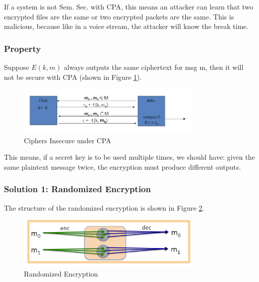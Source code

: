 If a system is not Sem. Sec. with CPA, this means an attacker can learn that two encrypted files are the same or two encrypted packets are the same. This is malicious, because like in a voice stream, the attacker will know the break time.

\subsubsection{Property}

Suppose $E(k,m)$ always outputs the same ciphertext for msg m, then it will not be secure with CPA (shown in Figure \ref{fig: 03 Ciphers Insecure under CPA}).

\begin{figure}[h]
    \centering
    \includegraphics[width=0.8\textwidth]{Stanford_Crypto_1/fig/03_block_cipher/Ciphers Insecure under CPA.png}
    \caption{Ciphers Insecure under CPA}
    \label{fig: 03 Ciphers Insecure under CPA}
\end{figure}

This means, if a secret key is to be used multiple times, we should have: given the same plaintext message twice, the encryption must produce different outputs.

\subsubsection{Solution 1: Randomized Encryption}

The structure of the randomized encryption is shown in Figure \ref{fig: 03 Randomized Encrpytion}.

\begin{figure}[h]
    \centering
    \includegraphics[width=0.8\textwidth]{Stanford_Crypto_1/fig/03_block_cipher/Randomized Encrpytion.png}
    \caption{Randomized Encryption}
    \label{fig: 03 Randomized Encrpytion}
\end{figure}

